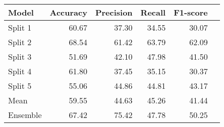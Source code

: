 \begin{tabular}{lrrrrr}
    \toprule
    Model & Accuracy & Precision & Recall & F1-score \\
    \midrule
    Split 1 & 60.67 & 37.30 & 34.55 & 30.07 \\
    Split 2 & 68.54 & 61.42 & 63.79 & 62.09 \\
    Split 3 & 51.69 & 42.10 & 47.98 & 41.50 \\
    Split 4 & 61.80 & 37.45 & 35.15 & 30.37 \\ 
    Split 5 & 55.06 & 44.86 & 44.81 & 43.17 \\
    \midrule
    Mean & 59.55 & 44.63 & 45.26 & 41.44 \\
    Ensemble & 67.42 & 75.42 & 47.78 & 50.25\\
    \bottomrule
\end{tabular}